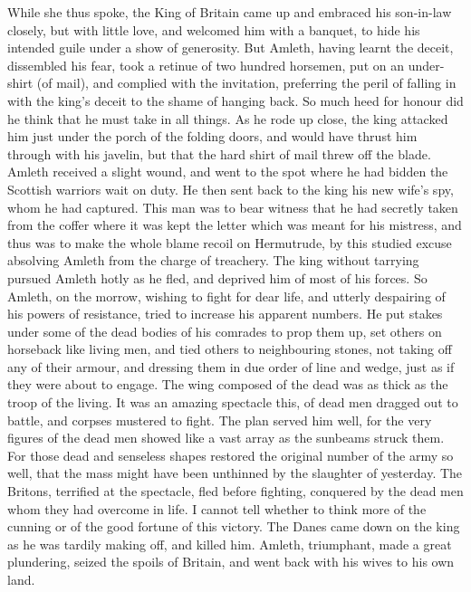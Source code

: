 \documentclass[10pt,a4paper]{report}
\begin{document}
While she thus spoke, the King of Britain came up and embraced his son-in-law closely, but with little love, and welcomed him with a banquet, to hide his intended guile under a show of generosity. But Amleth, having learnt the deceit, dissembled his fear, took a retinue of two hundred horsemen, put on an under-shirt (of mail), and complied with the invitation, preferring the peril of falling in with the king's deceit to the shame of hanging back. So much heed for honour did he think that he must take in all things. As he rode up close, the king attacked him just under the porch of the folding doors, and would have thrust him through with his javelin, but that the hard shirt of mail threw off the blade. Amleth received a slight wound, and went to the spot where he had bidden the Scottish warriors wait on duty. He then sent back to the king his new wife's spy, whom he had captured. This man was to bear witness that he had secretly taken from the coffer where it was kept the letter which was meant for his mistress, and thus was to make the whole blame recoil on Hermutrude, by this studied excuse absolving Amleth from the charge of treachery. The king without tarrying pursued Amleth hotly as he fled, and deprived him of most of his forces. So Amleth, on the morrow, wishing to fight for dear life, and utterly despairing of his powers of resistance, tried to increase his apparent numbers. He put stakes under some of the dead bodies of his comrades to prop them up, set others on horseback like living men, and tied others to neighbouring stones, not taking off any of their armour, and dressing them in due order of line and wedge, just as if they were about to engage. The wing composed of the dead was as thick as the troop of the living. It was an amazing spectacle this, of dead men dragged out to battle, and corpses mustered to fight. The plan served him well, for the very figures of the dead men showed like a vast array as the sunbeams struck them. For those dead and senseless shapes restored the original number of the army so well, that the mass might have been unthinned by the slaughter of yesterday. The Britons, terrified at the spectacle, fled before fighting, conquered by the dead men whom they had overcome in life. I cannot tell whether to think more of the cunning or of the good fortune of this victory. The Danes came down on the king as he was tardily making off, and killed him. Amleth, triumphant, made a great plundering, seized the spoils of Britain, and went back with his wives to his own land.\\
\end{document}
